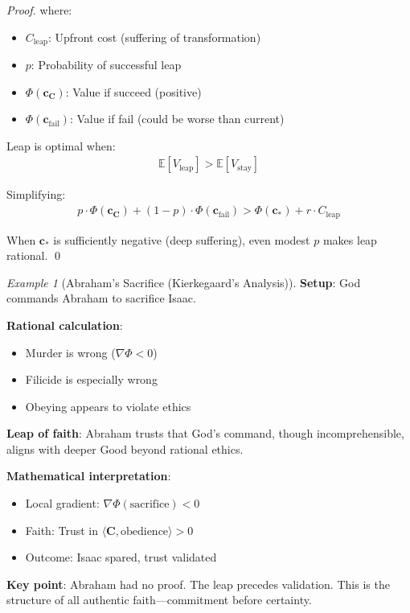 \documentclass[11pt,a4paper]{article}
\theoremstyle{definition}
\theoremstyle{remark}
\newtheorem{example}{Example}[section]
\newcommand{\cc}{\mathbf{c}}
\begin{document}
\begin{small}
\begin{enumerate}
\begin{proof}
where:
\begin{itemize}
    \item \(C_{\text{leap}}\): Upfront cost (suffering of transformation)
    \item \(p\): Probability of successful leap
    \item \(\Phi(\cc_{\mathbf{C}})\): Value if succeed (positive)
    \item \(\Phi(\cc_{\text{fail}})\): Value if fail (could be worse than current)
\end{itemize}

Leap is optimal when:
\begin{align}
\mathbb{E}[V_{\text{leap}}] > \mathbb{E}[V_{\text{stay}}]
\end{align}

Simplifying:
\begin{align}
p \cdot \Phi(\cc_{\mathbf{C}}) + (1-p) \cdot \Phi(\cc_{\text{fail}}) > \Phi(\cc_*) + r \cdot C_{\text{leap}}
\end{align}

When \(\cc_*\) is sufficiently negative (deep suffering), even modest \(p\) makes leap rational. \qed
\end{proof}

\begin{example}[Abraham's Sacrifice (Kierkegaard's Analysis)]
\textbf{Setup}: God commands Abraham to sacrifice Isaac.

\textbf{Rational calculation}:
\begin{itemize}
    \item Murder is wrong (\(\nabla \Phi < 0\))
    \item Filicide is especially wrong
    \item Obeying appears to violate ethics
\end{itemize}

\textbf{Leap of faith}: Abraham trusts that God's command, though incomprehensible, aligns with deeper Good beyond rational ethics.

\textbf{Mathematical interpretation}:
\begin{itemize}
    \item Local gradient: \(\nabla \Phi(\text{sacrifice}) < 0\)
    \item Faith: Trust in \(\langle \mathbf{C}, \text{obedience} \rangle > 0\)
    \item Outcome: Isaac spared, trust validated
\end{itemize}

\textbf{Key point}: Abraham had no proof. The leap precedes validation. This is the structure of all authentic faith—commitment before certainty.


\end{example}
\end{enumerate}
\end{small}
\end{document}
